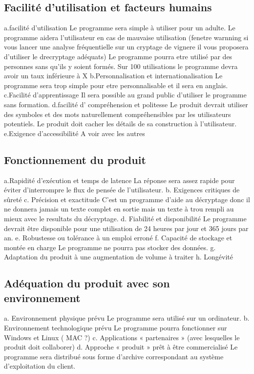 \documentclass[a4]{article}
\begin{document}
		\subsection{Facilité d’utilisation et facteurs humains}
		a.facilité d'utilisation
Le programme sera simple à utiliser pour un adulte.
Le programme aidera l'utilisateur en cas de mauvaise utilisation (fenetre warnning si vous lancer une analyse fréquentielle sur un cryptage de vignere il vous proposera d'utiliser le drecryptage adéquats)
Le programme pourra etre utilisé par des personnes sans qu'ils y soient formés.
Sur 100 utilisations le programme devra avoir un taux inférieure à X%
b.Personnalisation et internationalisation
Le programme sera trop simple pour etre personnalisable et il sera en anglais.
c.Facilité d'apprentissage
Il sera possible au grand public d’utiliser le programme sans formation.
d.facilité d' compréhension et politesse
Le produit devrait utiliser des symboles et des mots naturellement compréhensibles par les
utilisateurs potentiels.
Le produit doit cacher les détails de sa construction à l’utilisateur.
e.Exigence d'accessibilité
A voir avec les autres
		\subsection{Fonctionnement du produit}
		a.Rapidité d’exécution et temps de latence
La réponse sera assez rapide pour éviter d’interrompre le flux de pensée de l’utilisateur.
b. Exigences critiques de sûreté
c. Précision et exactitude
C'est un programme d'aide au décryptage donc il ne donnera jamais un texte complet en sortie mais un texte à trou rempli au mieux avec le resultats du décryptage.
d. Fiabilité et disponibilité
Le programme devrait être disponible pour une utilisation de 24 heures par jour et 365 jours
par an. 
e. Robustesse ou tolérance à un emploi erroné
f. Capacité de stockage et montée en charge
Le programme ne pourra pas stocker des données.
g. Adaptation du produit à une augmentation de volume à traiter
h. Longévité

		\subsection{Adéquation du produit avec son environnement}
		a. Environnement physique prévu
Le programme sera utilisé sur un ordinateur.
b. Environnement technologique prévu
Le programme pourra fonctionner sur Windows et Linux ( MAC ?)
c. Applications « partenaires » (avec lesquelles le produit doit collaborer)
d. Approche « produit » prêt à être commercialisé
Le programme sera distribué sous forme d'archive correspondant au système d'exploitation du client.
\end{document}
